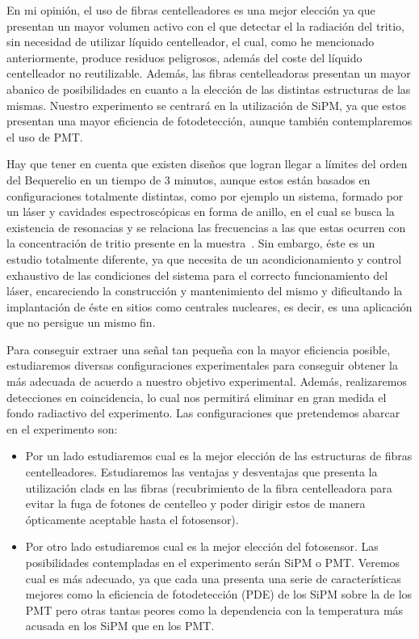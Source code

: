 En mi opinión, el uso de fibras centelleadores es una mejor elección ya que presentan un mayor volumen activo con el que detectar el la radiación del tritio,  sin necesidad de utilizar líquido centelleador, el cual, como he mencionado anteriormente, produce residuos peligrosos, además del coste del líquido centelleador no reutilizable. Además, las fibras centelleadoras presentan un mayor abanico de posibilidades en cuanto a la elección de las distintas estructuras de las mismas. Nuestro experimento se centrará en la utilización de SiPM, ya que estos presentan una mayor eficiencia de fotodetección, aunque también contemplaremos el uso de PMT. 

Hay que tener en cuenta que existen diseños que logran llegar a límites del orden del Bequerelio en un tiempo de 3 minutos, aunque estos están basados en configuraciones totalmente distintas, como por ejemplo un sistema, formado por un láser y cavidades espectroscópicas en forma de anillo, en el cual se  busca la existencia de resonacias y  se relaciona las frecuencias a las que estas ocurren con la concentración de tritio presente en la muestra~\cite{Anillo}. Sin embargo, éste es un estudio totalmente diferente, ya que necesita de un acondicionamiento y control exhaustivo de las condiciones del sistema para el correcto funcionamiento del láser, encareciendo la construcción y mantenimiento del mismo y dificultando la implantación de éste en sitios como centrales nucleares, es decir, es una aplicación que no persigue un mismo fin. 

Para conseguir extraer una señal tan pequeña con la mayor eficiencia posible,  estudiaremos diversas configuraciones experimentales para conseguir obtener la más adecuada de acuerdo a nuestro objetivo experimental. Además, realizaremos detecciones en coincidencia, lo cual nos permitirá eliminar en gran medida el fondo radiactivo del experimento. Las configuraciones que pretendemos abarcar en el experimento son: 
\begin{itemize}
\item {}
Por un lado estudiaremos cual es la mejor elección de las estructuras de fibras centelleadores. Estudiaremos las ventajas y desventajas que presenta la utilización clads en las fibras (recubrimiento de la fibra centelleadora para evitar la fuga de fotones de centelleo y poder dirigir estos de manera ópticamente aceptable hasta el fotosensor). 
\item {}
Por otro lado estudiaremos cual es la mejor elección del fotosensor. Las posibilidades contempladas en el experimento serán SiPM o PMT. Veremos cual es más adecuado, ya que cada una presenta una serie de características mejores como la eficiencia de fotodetección (PDE) de los SiPM sobre la de los PMT pero otras tantas peores como la dependencia con la temperatura más acusada en los SiPM que en los PMT.
\end{itemize}

